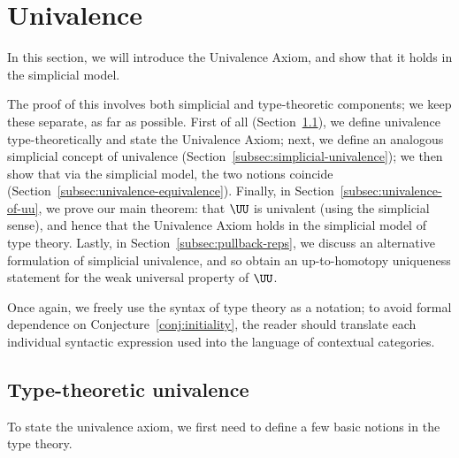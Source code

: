 
\section{Univalence} \label{section:univalence}

In this section, we will introduce the Univalence Axiom, and show that it holds in the simplicial model.

The proof of this involves both simplicial and type-theoretic components; we keep these separate, as far as possible.  First of all (Section~\ref{subsec:type-theoretic-univalence}), we define univalence type-theoretically and state the Univalence Axiom; next, we define an analogous simplicial concept of univalence (Section~\ref{subsec:simplicial-univalence}); we then show that via the simplicial model, the two notions coincide (Section~\ref{subsec:univalence-equivalence}).  Finally, in Section~\ref{subsec:univalence-of-uu}, we prove our main theorem: that $\UU$ is univalent (using the simplicial sense), and hence that the Univalence Axiom holds in the simplicial model of type theory.  Lastly, in Section~\ref{subsec:pullback-reps}, we discuss an alternative formulation of simplicial univalence, and so obtain an up-to-homotopy uniqueness statement for the weak universal property of $\UU$.

Once again, we freely use the syntax of type theory as a notation; to avoid formal dependence on Conjecture~\ref{conj:initiality}, the reader should translate each individual syntactic expression used into the language of contextual categories.

\subsection{Type-theoretic univalence} \label{subsec:type-theoretic-univalence}

To state the univalence axiom, we first need to define a few basic notions in the type theory.

